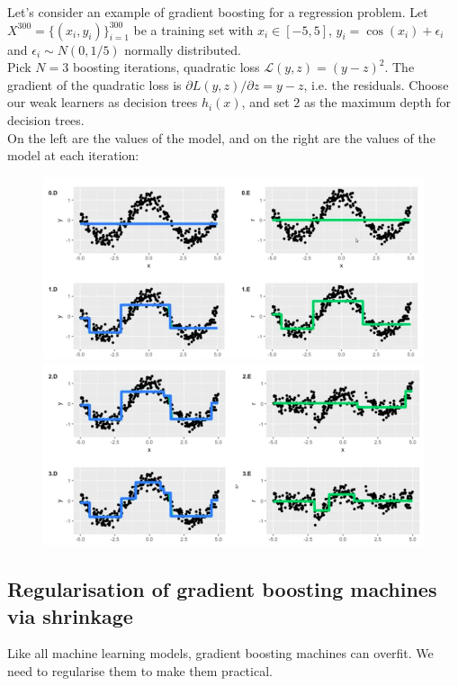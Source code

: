 \newpage
\begin{frameex}
Let's consider an example of gradient boosting for a regression problem. Let $X^{300} = \{(x_i,y_i)\}_{i=1}^{300}$ be a training set with $x_i \in [-5,5]$, $y_i = \cos(x_i) + \epsilon_i$ and $\epsilon_i \sim N(0,1/5)$ normally distributed.\\

Pick $N=3$ boosting iterations, quadratic loss $\mathcal{L}(y,z) = (y-z)^2$. The gradient of the quadratic loss is $\partial L(y,z)/\partial z = y - z$, i.e. the residuals. Choose our weak learners as decision trees $h_i(x)$, and set $2$ as the maximum depth for decision trees.\\

On the left are the values of the model, and on the right are the values of the model at each iteration:
\begin{figure}[H]
\centering
\includegraphics[scale=0.4]{gradientboost1.png}
\includegraphics[scale=0.4]{gradientboost2.png}
\end{figure}
\end{frameex}



\newpage
\subsection{Regularisation of gradient boosting machines via shrinkage}
Like all machine learning models, gradient boosting machines can overfit. We need to regularise them to make them practical.\\

